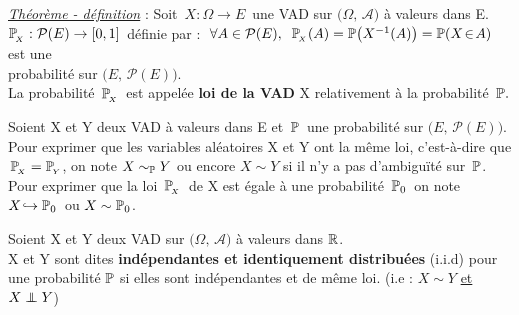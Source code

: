 \vspace{1.3cm}

\underline{\emph{Théorème - définition}} : Soit \(\,X:\Omega \to E\,\) une VAD sur \(\bigl(\Omega,\,\mathcal{A}\bigr)\) à valeurs dans E.\vspace{0.1cm}\\
\(\mathbb{P}_{\!_X}:\mathcal{P}(E)\to [0,1]\,\) définie par : \(\;\forall A\in \mathcal{P}(E),\ \: \PP_{\!_X}(A)=\PP\bigl(X^{-1}(A)\bigr)=\PP(X\!\in\! A)\) est une\vspace{0.1cm}\\
probabilité sur \(\bigl(E,\, \mathcal{P}(E)\bigr)\).\vspace{0.1cm}\\
La probabilité \(\,\mathbb{P}_{\!_X}\,\) est appelée \textbf{loi de la VAD} X relativement à la probabilité \(\,\mathbb{P}.\)

\vspace{1.3cm}

Soient X et Y deux VAD à valeurs dans E et \(\,\mathbb{P}\,\) une probabilité sur \(\bigl(E,\, \mathcal{P}(E)\bigr)\). Pour exprimer que les variables aléatoires X et Y ont la même loi, c'est-à-dire que \(\,\mathbb{P}_{\!_X}=\mathbb{P}_{\!_Y}\), on note \(X\sim_{\mathbb{P}} Y\) ou encore \(X\sim Y\) si il n'y a pas d'ambiguïté sur \(\,\mathbb{P}\).\vspace{0.4cm}\\
Pour exprimer que la loi \(\,\mathbb{P}_{\!_X}\,\) de X est égale à une probabilité \(\,\mathbb{P}_0\,\) on note \(X\!\hookrightarrow \mathbb{P}_0\,\) ou \(X\sim \mathbb{P}_0\).

\vspace{1.2cm}

Soient X et Y deux VAD sur \(\bigl(\Omega,\,\mathcal{A}\bigr)\) à valeurs dans $\mathbb{R}$.\\
X et Y sont dites \textbf{indépendantes et identiquement distribuées} (i.i.d) pour une probabilité $\mathbb{P}$ si elles sont indépendantes et de même loi. (i.e : \(X\sim Y\) \underline{et} \(X\perp\!\!\!\!\perp Y\))

\vspace{1.2cm}

